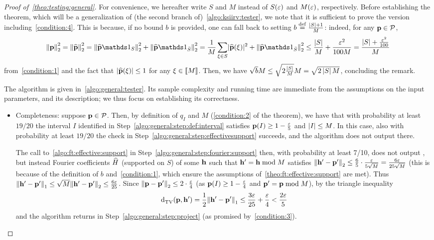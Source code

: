 \begin{proof}[Proof of~\cref{theo:testing:general}]
  For convenience, we hereafter write $S$ and $M$ instead of $S(\varepsilon)$ and $M(\varepsilon)$, respectively. Before establishing the theorem, which will be a generalization of (the second branch of)~\cref{algo:ksiirv:tester}, we note that it is sufficient to prove the version including~\cref{condition:4}. This is because, if no bound $b$ is provided, one can fall back to setting $b\stackrel{\rm def}{=}\frac{\left\lvert S \right\rvert+1}{M}$: indeed, for any $\mathbf{p}\in\mathcal{P}$,
  \begin{equation}\label{eq:default:bound:l2:norm}
      \normtwo{\p}^2 = \normtwo{\fourier{\p}}^2 = \normtwo{\fourier{\p}\indicSet{S}}^2+\normtwo{\fourier{\p}\indicSet{\bar{S}}}^2
      = \frac{1}{M}\sum_{\xi\in S}\dabs{\fourier{\p}(\xi)}^2 + \normtwo{\fourier{\p}\indicSet{\bar{S}}}^2
      \leq \frac{\abs{S}}{M} + \frac{\eps^2}{100M} = \frac{\abs{S}+\frac{\eps^2}{100}}{M}
  \end{equation}
  from~\cref{condition:1} and the fact that $\lvert \widehat{\mathbf{p}}(\xi) \rvert\leq 1$ for any $\xi\in\llbracket M\rrbracket$. Then, we have $\sqrt{b}M \leq \sqrt{2\frac{\left\lvert S \right\rvert}{M}}M = \sqrt{2\left\lvert S \right\rvert M}$, concluding the remark. 
  
  The algorithm is given in~\cref{algo:general:tester}. Its sample complexity and running time are immediate from the assumptions on the input parameters, and its description; we thus focus on establishing its correctness.
  
  \begin{itemize}
      \item Completeness: suppose $\mathbf{p}\in\mathcal{P}$. Then, by definition of $q_I$ and $M$ (\cref{condition:2} of the theorem), we have that with probability at least $19/20$ the interval $I$ identified in Step~\ref{algo:general:step:def:interval} satisfies $\mathbf{p}(I)\geq 1-\frac{\varepsilon}{5}$ and $\left\lvert I \right\rvert\leq M$. In this case, also with probability at least $19/20$ the check in Step~\ref{algo:general:step:effectivesupport} succeeds, and the algorithm does not output \reject there.
      
      The call to~\cref{algo:ft:effective:support} in Step~\ref{algo:general:step:fourier:support} then, with probability at least 7/10, does not output \reject, but instead Fourier coefficients $\widehat{H}$ (supported on $S$) of some $\mathbf{h}$ such that $\mathbf{h}'=\mathbf{h} \bmod M$ satisfies ${\lVert\mathbf{h}'-\mathbf{p}'{\rVert}}_2 \leq \frac{6}{5}\cdot \frac{\varepsilon}{5\sqrt{M}} = \frac{6\varepsilon}{25\sqrt{M}}$ (this is because of the definition of $b$ and~\cref{condition:1}, which ensure the assumptions of~\cref{theo:ft:effective:support} are met). Thus ${\lVert\mathbf{h}'-\mathbf{p}'{\rVert}}_1 \leq \sqrt{M}{\lVert\mathbf{h}'-\mathbf{p}'{\rVert}}_2 \leq \frac{6\varepsilon}{25}$. Since ${\lVert\mathbf{p}-\mathbf{p}'{\rVert}}_2 \leq 2\cdot\frac{\varepsilon}{4}$ (as $\mathbf{p}(I)\geq 1-\frac{\varepsilon}{4}$ and $\mathbf{p}'=\mathbf{p}\bmod M$), by the triangle inequality
      \[
        {\operatorname{d}_{\rm{TV}}^{}\!\left({\mathbf{p}, \mathbf{h}'}\right)} = \frac{1}{2}{\lVert\mathbf{h}'-\mathbf{p}'{\rVert}}_1 \leq \frac{3\varepsilon}{25}+\frac{\varepsilon}{4} < \frac{2\varepsilon}{5}
      \]
      and the algorithm returns \accept in Step~\ref{algo:general:step:project} (as promised by~\cref{condition:3}).
      

\end{itemize}
\end{proof}
